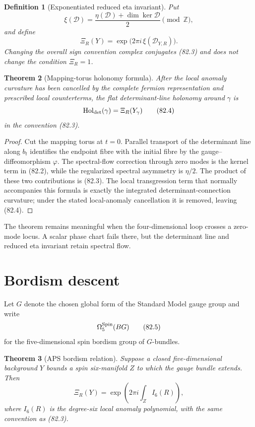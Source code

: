 \documentclass[11pt]{article}
\newtheorem{theorem}{Theorem}[section]
\newtheorem{definition}[theorem]{Definition}
\theoremstyle{remark}
\begin{document}
\begin{definition}[Exponentiated reduced eta invariant]
\label{def:v15v82-eta}
Put
\[
 \xi({\mathscr D})
 =
 \frac{\eta({\mathscr D})+\dim\ker{\mathscr D}}{2}
 \pmod{\mathbb Z},                                    \tag{82.2}
\]
and define
\[
 \Xi_R(Y)
 =
 \exp\bigl(2\pi i\,\xi({\mathscr D}_{Y,R})\bigr).      \tag{82.3}
\]
Changing the overall sign convention complex conjugates (82.3)
and does not change the condition \(\Xi_R=1\).
\end{definition}

\begin{theorem}[Mapping-torus holonomy formula]
\label{thm:v15v82-holonomy}
After the local anomaly curvature has been cancelled by the
complete fermion representation and prescribed local
counterterms, the flat determinant-line holonomy around \(\gamma\)
is
\[
 {\rm Hol}_{\rm det}(\gamma)=\Xi_R(Y_\gamma)           \tag{82.4}
\]
in the convention (82.3).
\end{theorem}

\begin{proof}
Cut the mapping torus at \(t=0\).  Parallel transport of the
determinant line along \(b_t\) identifies the endpoint fibre with
the initial fibre by the gauge--diffeomorphism \(\varphi\).
The spectral-flow correction through zero modes is the kernel term
in (82.2), while the regularized spectral asymmetry is
\(\eta/2\).  The product of these two contributions is (82.3).
The local transgression term that normally accompanies this
formula is exactly the integrated determinant-connection curvature;
under the stated local-anomaly cancellation it is removed, leaving
(82.4).
\end{proof}

The theorem remains meaningful when the four-dimensional loop
crosses a zero-mode locus.  A scalar phase chart fails there, but
the determinant line and reduced eta invariant retain spectral
flow.

\section{Bordism descent}

Let \(G\) denote the chosen global form of the Standard Model gauge
group and write
\[
 \Omega^{\rm Spin}_5(BG)                              \tag{82.5}
\]
for the five-dimensional spin bordism group of \(G\)-bundles.

\begin{theorem}[APS bordism relation]
\label{thm:v15v82-aps}
Suppose a closed five-dimensional background \(Y\) bounds a spin
six-manifold \(Z\) to which the gauge bundle extends.  Then
\[
 \Xi_R(Y)
 =
 \exp\left(2\pi i\int_Z I_6(R)\right),                 \tag{82.6}
\]
where \(I_6(R)\) is the degree-six local anomaly polynomial, with
the same convention as (82.3).
\end{theorem}
\end{document}
